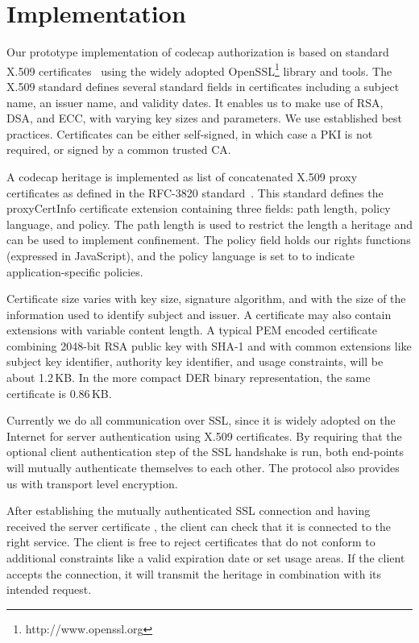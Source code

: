 \documentclass[10pt, conference, compsocconf]{IEEEtran}
\begin{document}
\section{Implementation}

Our prototype implementation of codecap authorization is based on
standard X.509 certificates~\cite{RFC-5280} using the widely adopted
OpenSSL\footnote{http://www.openssl.org}
library and tools.  The X.509 standard defines
several standard fields in certificates including a subject
name, an issuer name, and validity dates.  It enables us to
make use of RSA, DSA, and ECC, with varying key sizes and parameters.
We use established best practices.  Certificates can be either
self-signed, in which case a PKI is not required, or signed by a
common trusted CA.

A codecap heritage is implemented as list of concatenated X.509
proxy certificates as defined in the RFC-3820 standard~\cite{RFC-3820}.
This standard defines the proxyCertInfo
certificate extension containing three fields: path length, policy
language, and policy.  The path length  is used to
restrict the length a heritage and can be used to implement confinement.
The policy field holds our rights functions  (expressed in
JavaScript), and the policy
language  is set to  to indicate
application-specific policies.


Certificate size varies with key size, signature algorithm, and with
the size of the information used to identify subject and issuer.
A certificate may also contain extensions with variable content
length.  A typical PEM encoded certificate combining 2048-bit RSA
public key with SHA-1 and with common extensions like subject key
identifier, authority key identifier, and usage constraints, will
be about 1.2\,KB.  In the more compact DER binary representation,
the same certificate is 0.86\,KB.

Currently we do all communication over SSL, since it is
widely adopted on the Internet for server authentication using X.509
certificates.  By requiring that the optional client authentication
step of the SSL handshake is run, both end-points will mutually
authenticate themselves to each other. The protocol also provides
us with transport level encryption.

After establishing the mutually authenticated SSL connection and
having received the server certificate , the client can check
that it is connected to the right service.
The client is free to reject certificates that
do not conform to additional constraints like a valid expiration
date or set usage areas.  If the client accepts the connection, it
will transmit the heritage in combination with its intended request.
\end{document}
